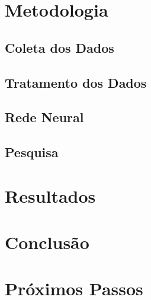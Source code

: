 \documentclass{automatextcc}
\begin{document}
\section{Metodologia}

\subsection{Coleta dos Dados}


\subsection{Tratamento dos Dados}


\subsection{Rede Neural}


\subsection{Pesquisa}



\newpage
\section{Resultados}

\newpage
\section{Conclusão}

\newpage
\section{Próximos Passos}


\newpage
{} %




\end{document}
